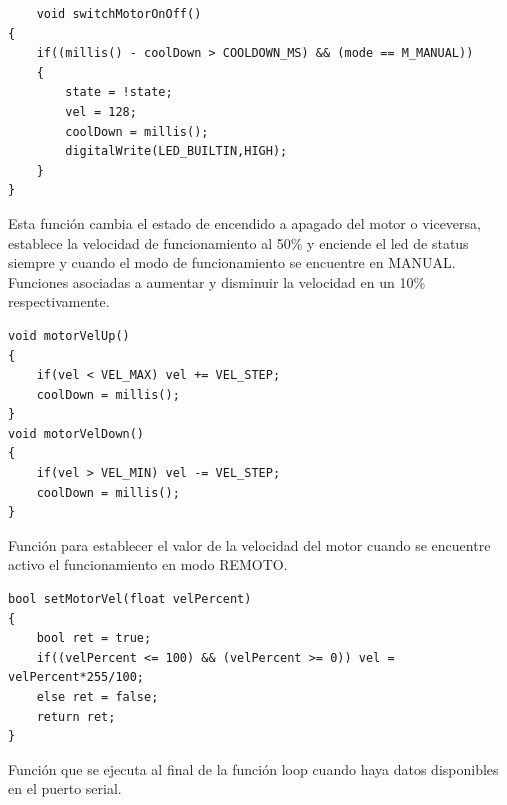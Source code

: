 \documentclass[a4paper, 12pt]{article}
\begin{document}
\begin{lstlisting}
	void switchMotorOnOff()
{
    if((millis() - coolDown > COOLDOWN_MS) && (mode == M_MANUAL))
    {
        state = !state;
        vel = 128;
        coolDown = millis();
        digitalWrite(LED_BUILTIN,HIGH);
    }
}
\end{lstlisting}

Esta función cambia el estado de encendido a apagado del motor o viceversa, establece la velocidad de funcionamiento al 50\% y enciende el led de status siempre y cuando el modo de funcionamiento se encuentre en MANUAL.
Funciones asociadas a aumentar y disminuir la velocidad en un 10\% respectivamente.
\newpage
\begin{lstlisting}
void motorVelUp()
{
    if(vel < VEL_MAX) vel += VEL_STEP;
    coolDown = millis();
}
void motorVelDown()
{
    if(vel > VEL_MIN) vel -= VEL_STEP;
    coolDown = millis();
}
\end{lstlisting}

Función para establecer el valor de la velocidad del motor cuando se encuentre activo el funcionamiento en modo REMOTO.

\begin{lstlisting}
bool setMotorVel(float velPercent)
{
    bool ret = true;
    if((velPercent <= 100) && (velPercent >= 0)) vel = velPercent*255/100;
    else ret = false;
    return ret;
}
\end{lstlisting}

Función que se ejecuta al final de la función loop cuando haya datos disponibles en el puerto serial.
\end{document}
